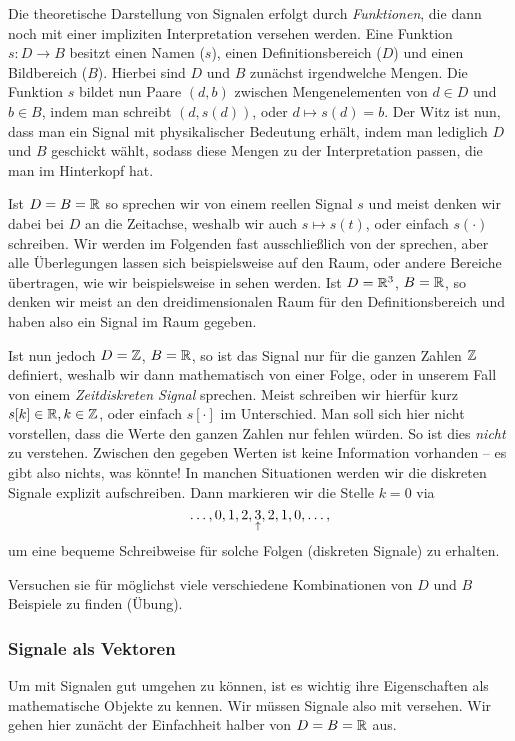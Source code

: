 Die theoretische Darstellung von Signalen erfolgt durch \emph{Funktionen}, die dann noch mit einer impliziten Interpretation versehen werden.
Eine Funktion $s : D \rightarrow B$ besitzt einen Namen ($s$), einen Definitionsbereich ($D$) und einen Bildbereich ($B$).
Hierbei sind $D$ und $B$ zunächst irgendwelche Mengen. 
Die Funktion $s$ bildet nun Paare $(d,b)$ zwischen Mengenelementen von $d \in D$ und $b \in B$, indem man schreibt $(d, s(d))$, oder $d \mapsto s(d) = b$.
Der Witz ist nun, dass man ein Signal mit physikalischer Bedeutung erhält, indem man lediglich $D$ und $B$ geschickt wählt, sodass diese Mengen zu der Interpretation passen, die man im Hinterkopf hat.

Ist $D = B = \mathbb{R}$ so sprechen wir von einem reellen Signal $s$ und meist denken wir dabei bei $D$ an die Zeitachse, weshalb wir auch $s \mapsto s(t)$, oder einfach $s(\cdot)$ schreiben. 
Wir werden im Folgenden fast ausschließlich von der  sprechen, aber alle Überlegungen lassen sich beispielsweise auf den Raum, oder andere Bereiche übertragen, wie wir beispielsweise in  sehen werden.
Ist $D = \mathbb{R}^3$, $B = \mathbb{R}$, so denken wir meist an den dreidimensionalen Raum für den Definitionsbereich und haben also ein Signal im Raum gegeben.

Ist nun jedoch $D = \mathbb{Z}$, $B = \mathbb{R}$, so ist das Signal nur für die ganzen Zahlen $\mathbb{Z}$ definiert, weshalb wir dann mathematisch von einer Folge, oder in unserem Fall von einem \emph{Zeitdiskreten Signal} sprechen.
Meist schreiben wir hierfür kurz $s[k] \in \mathbb{R}, k\in \mathbb{Z}$, oder einfach $s[\cdot]$ im Unterschied.
Man soll sich hier nicht vorstellen, dass die Werte  den ganzen Zahlen nur fehlen würden. 
So ist dies \emph{nicht} zu verstehen. 
Zwischen den gegeben Werten ist keine Information vorhanden -- es gibt also nichts, was  könnte!
In manchen Situationen werden wir die diskreten Signale explizit aufschreiben. 
Dann markieren wir die Stelle $k = 0$ via
\[
\dots, 0, 1, 2, \underset{\uparrow}{3}, 2, 1, 0, \dots,
\]
um eine bequeme Schreibweise für solche Folgen (diskreten Signale) zu erhalten. 

Versuchen sie für möglichst viele verschiedene Kombinationen von $D$ und $B$ Beispiele zu finden (Übung).
%
\subsubsection{Signale als Vektoren}\label{sec:signals_vec}
%
Um mit Signalen gut umgehen zu können, ist es wichtig ihre Eigenschaften als mathematische Objekte zu kennen.
Wir müssen Signale also mit  versehen.
Wir gehen hier zunächt der Einfachheit halber von $D = B = \mathbb{R}$ aus.

